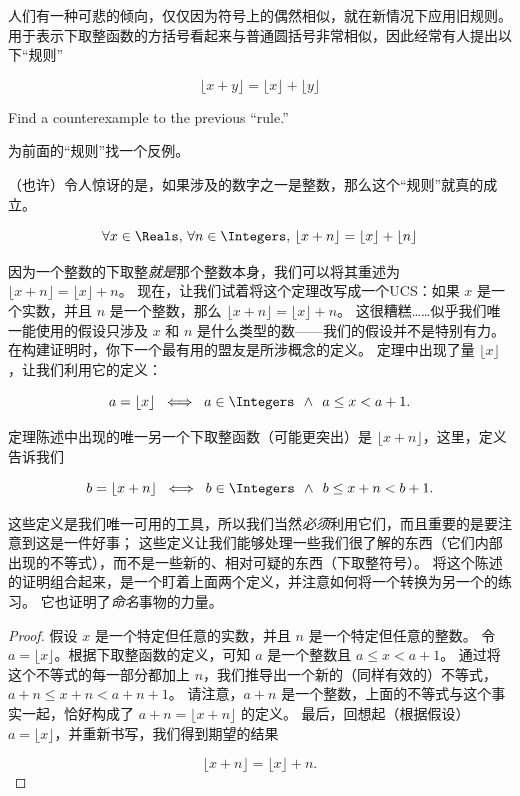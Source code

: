 人们有一种可悲的倾向，仅仅因为符号上的偶然相似，就在新情况下应用旧规则。
用于表示下取整函数的方括号看起来与普通圆括号非常相似，因此经常有人提出以下“规则”

\[ \lfloor x + y \rfloor = \lfloor x \rfloor + \lfloor y \rfloor \]

\begin{exer}
      Find a counterexample to the previous ``rule.''

      为前面的“规则”找一个反例。
\end{exer}

（也许）令人惊讶的是，如果涉及的数字之一是整数，那么这个“规则”就真的成立。

\begin{thm}
      \[ \forall x \in \Reals, \, \forall n \in \Integers, \,
            \lfloor x + n \rfloor = \lfloor x \rfloor + \lfloor n \rfloor \]
\end{thm}

因为一个整数的下取整{\em 就是}那个整数本身，我们可以将其重述为 $ \lfloor x + n \rfloor = \lfloor x \rfloor +  n$。
现在，让我们试着将这个定理改写成一个UCS：如果 $x$ 是一个实数，并且 $n$ 是一个整数，那么 $\lfloor x + n \rfloor = \lfloor x \rfloor +  n$。
这很糟糕……似乎我们唯一能使用的假设只涉及 $x$ 和 $n$ 是什么类型的数——我们的假设并不是特别有力。
在构建证明时，你下一个最有用的盟友是所涉概念的定义。
定理中出现了量 $\lfloor x \rfloor$，让我们利用它的定义：

\[ a = \lfloor x  \rfloor \; \iff \; a \in \Integers \; \,
      \land \; \, a \leq x < a+1.
\]

定理陈述中出现的唯一另一个下取整函数（可能更突出）是 $\lfloor x + n\rfloor$，这里，定义告诉我们

\[ b = \lfloor x + n \rfloor \; \iff \;
      b \in \Integers \; \, \land \; \, b \leq x + n < b+1.
\]

这些定义是我们唯一可用的工具，所以我们当然\emph{必须}利用它们，而且重要的是要注意到这是一件好事；
这些定义让我们能够处理一些我们很了解的东西（它们内部出现的不等式），而不是一些新的、相对可疑的东西（下取整符号）。
将这个陈述的证明组合起来，是一个盯着上面两个定义，并注意如何将一个转换为另一个的练习。
它也证明了\emph{命名}事物的力量。

\begin{proof}
      假设 $x$ 是一个特定但任意的实数，并且 $n$ 是一个特定但任意的整数。
      令 $a = \lfloor x \rfloor$。根据下取整函数的定义，可知 $a$ 是一个整数且 $a \leq x < a+1$。
      通过将这个不等式的每一部分都加上 $n$，我们推导出一个新的（同样有效的）不等式，$a+n \leq x+n < a+n+1$。
      请注意，$a+n$ 是一个整数，上面的不等式与这个事实一起，恰好构成了 $a + n = \lfloor x + n \rfloor$ 的定义。
      最后，回想起（根据假设）$a = \lfloor x \rfloor$，并重新书写，我们得到期望的结果

      \[ \lfloor x + n \rfloor = \lfloor x \rfloor + n.
      \]

\end{proof}

